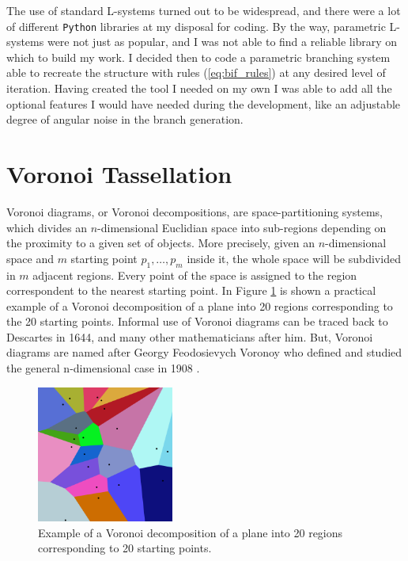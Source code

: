     The use of standard L-systems turned out to be widespread, and there were a lot of different \texttt{Python} libraries at my disposal for coding. By the way, parametric L-systems were not just as popular, and I was not able to find a reliable library on which to build my work. I decided then to code a parametric branching system able to recreate the structure with rules (\ref{eq:bif_rules}) at any desired level of iteration. Having created the tool I needed on my own I was able to add all the optional features I would have needed during the development, like an adjustable degree of angular noise in the branch generation.

\section{Voronoi Tassellation} \label{ssec:vor_tass}
    Voronoi diagrams, or Voronoi decompositions, are space-partitioning systems, which divides an $n$-dimensional Euclidian space into sub-regions depending on the proximity to a given set of objects. More precisely, given an $n$-dimensional space and $m$ starting point $p_1,\dots, p_m$ inside it, the whole space will be subdivided in $m$ adjacent regions. Every point of the space is assigned to the region correspondent to the nearest starting point. In Figure \ref{fig:vor_20} is shown a practical example of a Voronoi decomposition of a plane into 20 regions corresponding to the 20 starting points. Informal use of Voronoi diagrams can be traced back to Descartes in 1644, and many other mathematicians after him. But, Voronoi diagrams are named after Georgy Feodosievych Voronoy who defined and studied the general n-dimensional case in 1908 \cite{VoronoiNouvellesAD}.

    \begin{figure}
        \centering
        \includegraphics[width = 0.4\textwidth]{images/vor_20}
        \caption{Example of a Voronoi decomposition of a plane into 20 regions corresponding to 20 starting points.}
        \label{fig:vor_20}
    \end{figure}

